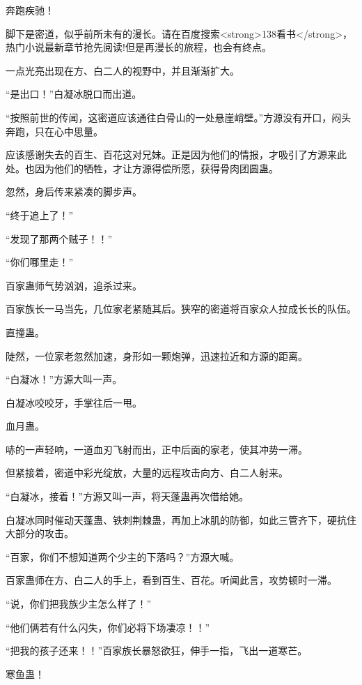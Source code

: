
\begin{this_body}

奔跑疾驰！

脚下是密道，似乎前所未有的漫长。请在百度搜索<strong>138看书</strong>，热门小说最新章节抢先阅读!但是再漫长的旅程，也会有终点。

一点光亮出现在方、白二人的视野中，并且渐渐扩大。

“是出口！”白凝冰脱口而出道。

“按照前世的传闻，这密道应该通往白骨山的一处悬崖峭壁。”方源没有开口，闷头奔跑，只在心中思量。

应该感谢失去的百生、百花这对兄妹。正是因为他们的情报，才吸引了方源来此处。也因为他们的牺牲，才让方源得偿所愿，获得骨肉团圆蛊。

忽然，身后传来紧凑的脚步声。

“终于追上了！”

“发现了那两个贼子！！”

“你们哪里走！”

百家蛊师气势汹汹，追杀过来。

百家族长一马当先，几位家老紧随其后。狭窄的密道将百家众人拉成长长的队伍。

直撞蛊。

陡然，一位家老忽然加速，身形如一颗炮弹，迅速拉近和方源的距离。

“白凝冰！”方源大叫一声。

白凝冰咬咬牙，手掌往后一甩。

血月蛊。

哧的一声轻响，一道血刃飞射而出，正中后面的家老，使其冲势一滞。

但紧接着，密道中彩光绽放，大量的远程攻击向方、白二人射来。

“白凝冰，接着！”方源又叫一声，将天蓬蛊再次借给她。

白凝冰同时催动天蓬蛊、铁刺荆棘蛊，再加上冰肌的防御，如此三管齐下，硬抗住大部分的攻击。

“百家，你们不想知道两个少主的下落吗？”方源大喊。

百家蛊师在方、白二人的手上，看到百生、百花。听闻此言，攻势顿时一滞。

“说，你们把我族少主怎么样了！”

“他们俩若有什么闪失，你们必将下场凄凉！！”

“把我的孩子还来！！”百家族长暴怒欲狂，伸手一指，飞出一道寒芒。

寒鱼蛊！


\end{this_body}
